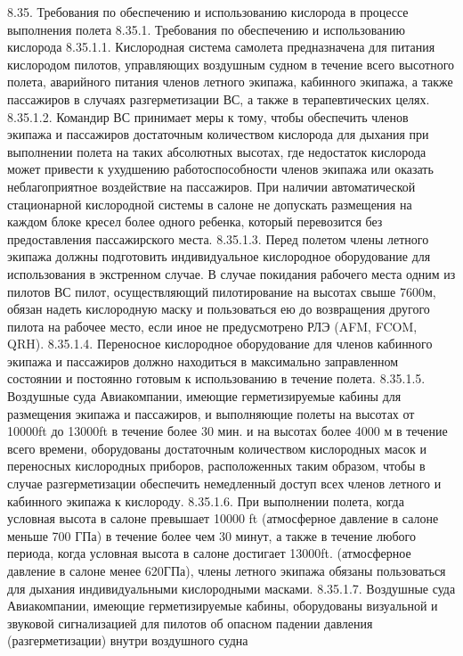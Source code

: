 8.35. Требования по обеспечению и использованию кислорода в процессе выполнения полета
8.35.1.	Требования по обеспечению и использованию кислорода
8.35.1.1. Кислородная система самолета предназначена для питания кислородом пилотов, управляющих воздушным судном в течение всего высотного полета, аварийного питания членов летного экипажа, кабинного экипажа, а также пассажиров в случаях разгерметизации ВС, а также в терапевтических целях.
8.35.1.2. Командир ВС принимает меры к тому, чтобы обеспечить членов экипажа и пассажиров достаточным количеством кислорода для дыхания при выполнении полета на таких абсолютных высотах, где недостаток кислорода может привести к ухудшению работоспособности членов экипажа или оказать неблагоприятное воздействие на пассажиров.
При наличии автоматической стационарной кислородной системы в салоне не допускать размещения на каждом блоке кресел более одного ребенка, который перевозится без предоставления пассажирского места.
8.35.1.3. Перед полетом члены летного экипажа должны подготовить индивидуальное кислородное оборудование для использования в экстренном случае. В случае покидания рабочего места одним из пилотов ВС пилот, осуществляющий пилотирование на высотах свыше 7600м, обязан надеть кислородную маску и пользоваться ею до возвращения другого пилота на рабочее место, если иное не предусмотрено РЛЭ (AFM, FCOM, QRH).
8.35.1.4. Переносное кислородное оборудование для членов кабинного экипажа и пассажиров должно находиться в максимально заправленном состоянии и постоянно готовым к использованию в течение полета.
8.35.1.5. Воздушные суда Авиакомпании, имеющие герметизируемые кабины для размещения экипажа и пассажиров, и выполняющие полеты на высотах от 10000ft до 13000ft в течение более 30 мин. и на высотах более 4000 м в течение всего времени, оборудованы достаточным количеством кислородных масок и переносных кислородных приборов, расположенных таким образом, чтобы в случае разгерметизации обеспечить немедленный доступ всех членов летного и кабинного экипажа к кислороду.
8.35.1.6. При выполнении полета, когда условная высота в салоне превышает 10000 ft (атмосферное давление в салоне меньше 700 ГПа) в течение более чем 30 минут, а также в течение любого периода, когда условная высота в салоне достигает 13000ft. (атмосферное давление в салоне менее 620ГПа), члены летного экипажа обязаны пользоваться для дыхания индивидуальными кислородными масками.
8.35.1.7. Воздушные суда Авиакомпании, имеющие герметизируемые кабины, оборудованы визуальной и звуковой сигнализацией для пилотов об опасном падении давления (разгерметизации) внутри воздушного судна
